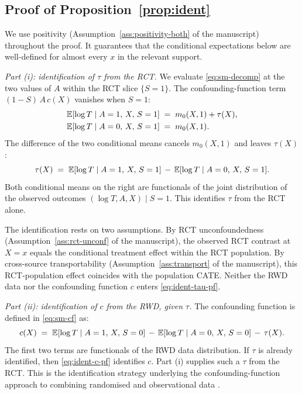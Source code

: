 \subsection{Proof of Proposition~\ref{prop:ident}}
We use positivity (Assumption~\ref{ass:positivity-both} of the manuscript) throughout the proof.
It guarantees that the conditional expectations below are well-defined for almost every $x$ in the relevant support.

\emph{Part (i): identification of $\tau$ from the RCT.}
We evaluate \eqref{eq:sm-decomp} at the two values of $A$ within the RCT slice $\{S = 1\}$.
The confounding-function term $(1 - S)\,A\,c(X)$ vanishes when $S = 1$:
\begin{align}
\mathbb{E}[\log T \mid A = 1,\, X,\, S = 1] &\;=\; m_0(X, 1) + \tau(X),\\
\mathbb{E}[\log T \mid A = 0,\, X,\, S = 1] &\;=\; m_0(X, 1).
\end{align}
The difference of the two conditional means cancels $m_0(X, 1)$ and leaves $\tau(X)$:
\begin{equation}
\tau(X) \;=\; \mathbb{E}[\log T \mid A = 1,\, X,\, S = 1] \,-\, \mathbb{E}[\log T \mid A = 0,\, X,\, S = 1].
\label{eq:ident-tau-pf}
\end{equation}
Both conditional means on the right are functionals of the joint distribution of the observed outcomes $(\log T, A, X) \mid S = 1$.
This identifies $\tau$ from the RCT alone.

The identification rests on two assumptions.
By RCT unconfoundedness (Assumption~\ref{ass:rct-unconf} of the manuscript), the observed RCT contrast at $X = x$ equals the conditional treatment effect within the RCT population.
By cross-source transportability (Assumption~\ref{ass:transport} of the manuscript), this RCT-population effect coincides with the population CATE.
Neither the RWD data nor the confounding function $c$ enters \eqref{eq:ident-tau-pf}.

\emph{Part (ii): identification of $c$ from the RWD, given $\tau$.}
The confounding function is defined in \eqref{eq:sm-cf} as:
\begin{equation}
c(X) \;=\; \mathbb{E}[\log T \mid A = 1,\, X,\, S = 0] \,-\, \mathbb{E}[\log T \mid A = 0,\, X,\, S = 0] \,-\, \tau(X).
\label{eq:ident-c-pf}
\end{equation}
The first two terms are functionals of the RWD data distribution.
If $\tau$ is already identified, then \eqref{eq:ident-c-pf} identifies $c$.
Part (i) supplies such a $\tau$ from the RCT.
This is the identification strategy underlying the confounding-function approach to combining randomised and observational data \citep{Kallus2018, YangLiuZengWang2025}.

